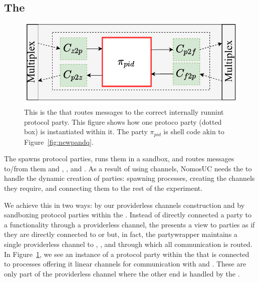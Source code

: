 \subsection{The \partywrapper}
\begin{figure}
	\centering
	\includegraphics[scale=0.5]{figures/singleshellmultiplex.pdf}
	\caption{This is the \partywrapper that routes messages to the correct internally runnint protocol party. This figure shows how one protoco party (dotted box) is instantiated within it. The party $\pi_{pid}$ is shell code akin to Figure~\ref{fig:newpandq}.}%
	\label{fig:singlemultiplex}
	\vspace{-3mm}
\end{figure}
The \partywrapper spawns protocol parties, runs them in a sandbox, and routes messages to/from them and \Z, \F, and \A.
As a result of using channels, NomosUC needs the \partywrapper to handle the dynamic creation of parties: spawning processes, creating the channels they require, and connecting them to the rest of the experiment.

We achieve this in two ways: by our providerless channels construction and by sandboxing protocol parties within the \partywrapper.
Instead of directly connected a party to a functionality through a providerless channel, the \partywrapper presents a view to parties as if they are directly connected to \F or \Z but, in fact, the partywrapper maintains a single providerless channel to \Z, \F, and \A through which all communication is routed. 
In Figure~\ref{fig:singlemultiplex}, we see an instance of a protocol party within the \partywrapper that is connected to processes offering it linear channels for communication with \Z and \F. 
These are only part of the providerless channel where the other end is handled by the \partywrapper.

